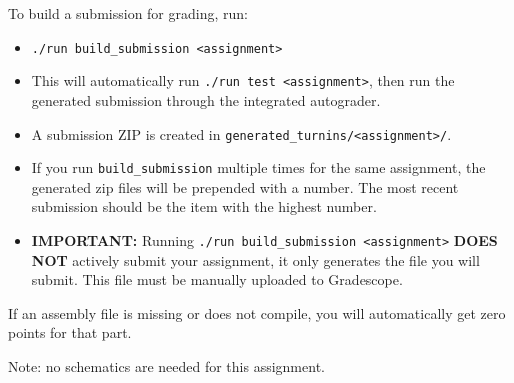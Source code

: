 \documentclass[12pt]{article}
\begin{document}
To build a submission for grading, run:
\begin{itemize}
\item \texttt{./run build\_submission <assignment>}
\item This will automatically run \texttt{./run test <assignment>}, then run the generated submission
through the integrated autograder.
\item A submission ZIP is created in \texttt{generated\_turnins/<assignment>/}.
\item If you run \texttt{build\_submission} multiple times for the same assignment, the generated zip files will be prepended with a number. The most recent submission should be the item with the highest number.
\item \textbf{IMPORTANT:} Running \texttt{./run build\_submission <assignment>} \textbf{DOES NOT} actively submit your assignment, it only generates the file you will submit. This file must be manually uploaded to Gradescope.
\end{itemize}

If an assembly file is missing or does not compile, you will automatically get zero points for that part.

Note: no schematics are needed for this assignment.
\end{document}
